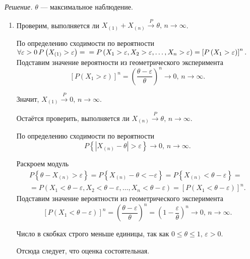 \textit{Решение.} $ \theta $ --- максимальное наблюдение.
\begin{enumerate}[label=\alph*)]
  \item Проверим,
  выполняется ли
  $X_{ \left( 1 \right) } + X_{ \left( n \right) } \overset{P}{ \to } \theta, \,
    n \to \infty $.

  По определению сходимости по вероятности
  $ \forall \varepsilon > 0 \,
    P \left( X_{ \left( 1 \right) } > \varepsilon \right) = \\
    = P \left( X_1 > \varepsilon, X_2 > \varepsilon, \dotsc, X_n > \varepsilon \right) =
    \left[ P \left( X_1 > \varepsilon \right) \right]^n.$
  Подставим значение вероятности из геометрического эксперимента
  $$ \left[ P \left( X_1 > \varepsilon \right) \right]^n =
    \left( \frac{ \theta - \varepsilon }{ \theta } \right)^n \to 0, \,
    n \to \infty.$$

  Значит, $X_{ \left( 1 \right) } \overset{P}{ \to } 0, \, n \to \infty $.

  Остаётся проверить,
  выполняется ли $X_{ \left( n \right) } \overset{P}{ \to } \theta, \, n \to \infty $.

  По определению сходимости по вероятности
  $$P \left\{ \left| X_{ \left( n \right) } - \theta \right| > \varepsilon \right\} \to 0, \,
    n \to \infty.$$

  Раскроем модуль
  \begin{equation*}
    \begin{split}
      P \left\{ \theta - X_{ \left( n \right) } > \varepsilon \right\} =
      P \left\{ X_{ \left( n \right) } - \theta < - \varepsilon \right\} =
      P \left\{ X_{ \left( n \right) } < \theta - \varepsilon \right\} = \\
      = P \left(
        X_1 < \theta - \varepsilon, X_2 < \theta - \varepsilon, \dotsc, X_n < \theta - \varepsilon
      \right) =
      \left[ P \left( X_1 < \theta - \varepsilon \right) \right]^n.
    \end{split}
  \end{equation*}
  Подставим значение вероятности из геометрического эксперимента
  $$ \left[ P \left( X_1 < \theta - \varepsilon \right) \right]^n =
    \left( \frac{ \theta - \varepsilon }{ \theta } \right)^n =
    \left( 1 - \frac{ \varepsilon }{ \theta } \right)^n \to 0, \,
    n \to \infty.$$

  Число в скобках строго меньше единицы, так как $0 \leq \theta \leq 1, \, \varepsilon > 0$.

  Отсюда следует, что оценка состоятельная.


\end{enumerate}
